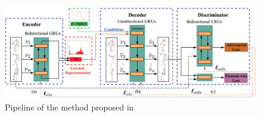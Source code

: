 \begin{figure}[htbp]
\begin{center}
\includegraphics[width=\textwidth]{images/representation_learning.png}
\end{center}
\caption{Pipeline of the method proposed in \cite{wang2019comparative}}
\label{figure:representation_learning}
\end{figure}
